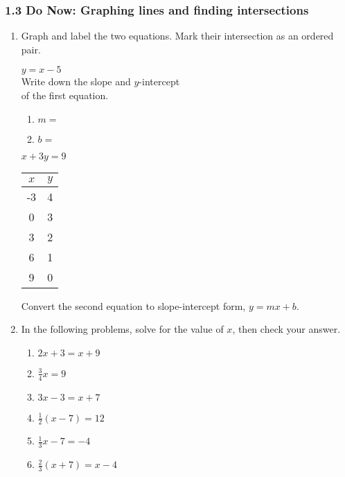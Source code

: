 \documentclass[12pt, twoside]{article}
\begin{document}
\subsubsection*{1.3 Do Now: Graphing lines and finding intersections}
\begin{enumerate}
  \item Graph and label the two equations. Mark their intersection as an ordered pair.

  \begin{multicols}{2}
    $y = x-5$ \\[0.5cm]
    Write down the slope and $y$-intercept\\ of the first equation.
    \begin{enumerate}
      \item $m=$ \bigskip
      \item $b=$
    \end{enumerate}

    $x+3y = 9$
      \begin{flushleft}
      \begin{tabular}{c|c}
          $x$ & $y$ \\
          \hline
           -3 & 4 \\[5pt]
           0 & 3 \\[5pt]
           3 & 2 \\[5pt]
           6 & 1 \\[5pt]
           9 & 0 \\
          \end{tabular}
        \end{flushleft}
    \end{multicols}

  \begin{center} %
  \end{center}
Convert the second equation to slope-intercept form, $y=mx+b$.

\newpage
\item In the following problems, solve for the value of $x$, then check your answer.
\begin{multicols}{2}
  \begin{enumerate}[itemsep=5cm]
    \item $2x+3=x + 9$
    \item $\frac{3}{4}x =9$
    \item $3x-3=x + 7$
    \item $\frac{1}{2}(x-7)=12$
    \item $\frac{1}{3} x-7=-4$    
    \item $\frac{2}{3}(x+7)=x-4$
  \end{enumerate}
  \end{multicols} \vspace{4cm}



\end{enumerate}
\end{document}

